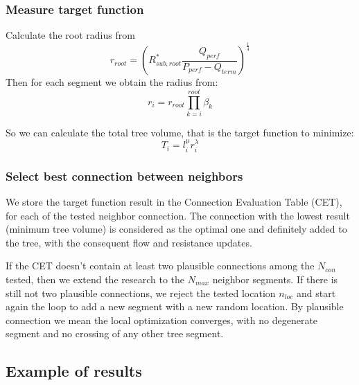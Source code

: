\documentclass[a4paper, 11pt]{article} %
\begin{document}
\subsubsection{Measure target function}
Calculate the root radius from
\begin{equation}
r_{root} = \left( R_{sub, root}^* \frac{Q_{perf}}{P_{perf}-Q_{term}}\right)^\frac{1}{4}
\end{equation}
Then for each segment we obtain the radius from:
\begin{equation}
r_i = r_{root} \prod\limits_{k=i}^{root} \beta_k
\end{equation}

So we can calculate the total tree volume, that is the target function to minimize:
\begin{equation}
T_i = l_i^{\mu} r_i^{\lambda}
\end{equation}

 

\subsubsection{Select best connection between neighbors}
We store the target function result in the Connection Evaluation Table (CET), for each of the tested neighbor connection. The connection with the lowest result (minimum tree volume) is considered as the optimal one and definitely added to the tree, with the consequent flow and resistance updates.

If the CET doesn't contain at least two plausible connections among the $N_{con}$ tested, then we extend the research to the $N_{max}$ neighbor segments. If there is still not two plausible connections, we reject the tested location $n_{loc}$ and start again the loop to add a new segment with a new random location.
By plausible connection we mean the local optimization converges, with no degenerate segment and no crossing of any other tree segment. 


\subsection{Example of results}
\end{document}
